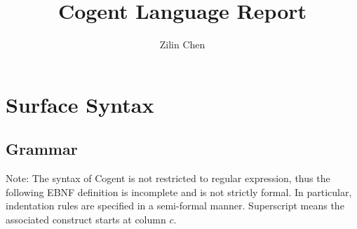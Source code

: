 \documentclass[a4paper]{article}
\newcommand{\cogent}{Cogent\xspace}
\begin{document}
\title{\cogent Language Report}
\author{Zilin Chen}

\maketitle

\section{Surface Syntax}

\subsection{Grammar} \label{ssec:grammar}
Note: The syntax of \cogent is not restricted to regular expression, thus the following EBNF definition is incomplete and is
not strictly formal. In particular, indentation rules are specified in a semi-formal manner. Superscript  means
the associated construct starts at column $c$.
\end{document}
